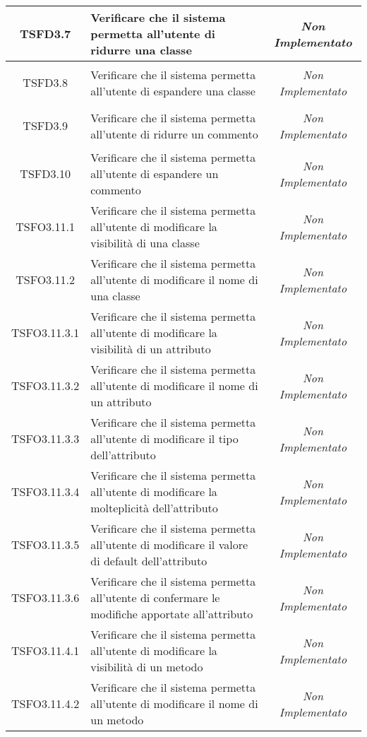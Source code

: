\begin{longtable}{|c|>{}m{8cm}|c|}
\hypertarget{TSFD3.7}{TSFD3.7} & Verificare che il sistema permetta all'utente di ridurre una classe & \textit{Non Implementato}\\ \hline
\hypertarget{TSFD3.8}{TSFD3.8} & Verificare che il sistema permetta all'utente di espandere una classe & \textit{Non Implementato}\\ \hline
\hypertarget{TSFD3.9}{TSFD3.9} & Verificare che il sistema permetta all'utente di ridurre un commento & \textit{Non Implementato}\\ \hline
\hypertarget{TSFD3.10}{TSFD3.10} & Verificare che il sistema permetta all'utente di espandere un commento & \textit{Non Implementato}\\ \hline
\hypertarget{TSFO3.11.1}{TSFO3.11.1} & Verificare che il sistema permetta all'utente di modificare la visibilità di una classe & \textit{Non Implementato}\\ \hline
\hypertarget{TSFO3.11.2}{TSFO3.11.2} & Verificare che il sistema permetta all'utente di modificare il nome di una classe & \textit{Non Implementato}\\ \hline
\hypertarget{TSFO3.11.3.1}{TSFO3.11.3.1} & Verificare che il sistema permetta all'utente di modificare la visibilità di un attributo & \textit{Non Implementato}\\ \hline
\hypertarget{TSFO3.11.3.2}{TSFO3.11.3.2} & Verificare che il sistema permetta all'utente di modificare il nome di un attributo & \textit{Non Implementato}\\ \hline
\hypertarget{TSFO3.11.3.3}{TSFO3.11.3.3} & Verificare che il sistema permetta all'utente di modificare il tipo dell'attributo & \textit{Non Implementato}\\ \hline
\hypertarget{TSFO3.11.3.4}{TSFO3.11.3.4} & Verificare che il sistema permetta all'utente di modificare la molteplicità dell'attributo & \textit{Non Implementato}\\ \hline
\hypertarget{TSFO3.11.3.5}{TSFO3.11.3.5} & Verificare che il sistema permetta all'utente di modificare il valore di default dell'attributo & \textit{Non Implementato}\\ \hline
\hypertarget{TSFO3.11.3.6}{TSFO3.11.3.6} & Verificare che il sistema permetta all'utente di confermare le modifiche apportate all'attributo & \textit{Non Implementato}\\ \hline
\hypertarget{TSFO3.11.4.1}{TSFO3.11.4.1} & Verificare che il sistema permetta all'utente di modificare la visibilità di un metodo & \textit{Non Implementato}\\ \hline
\hypertarget{TSFO3.11.4.2}{TSFO3.11.4.2} & Verificare che il sistema permetta all'utente di modificare il nome di un metodo & \textit{Non Implementato}\\ \hline

\end{longtable}
